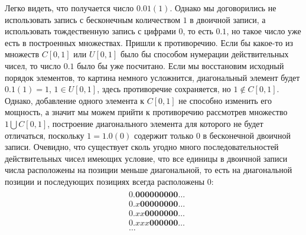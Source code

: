 \documentclass[12pt]{article}
\begin{document}
Легко видеть, что получается число $0.01(1)$. Однако мы договорились не использовать запись с бесконечным количеством $1$ в двоичной записи, а использовать тождественную запись с цифрами $0$, то есть $0.1$, но такое число уже есть в построенных множествах. Пришли к противоречию. Если бы какое-то из множеств $C[0, 1]$ или $U[0, 1]$ было бы способом нумерации действительных чисел, то число $0.1$ было бы уже посчитано. Если мы восстановим исходный порядок элементов, то картина немного усложнится, диагональный элемент будет $0.1(1) = 1$, $1 \in U[0, 1]$, здесь противоречие сохраняется, но $1 \notin C[0, 1]$. Однако, добавление одного элемента к $C[0, 1]$ не способно изменить его мощность, а значит мы можем прийти к противоречию рассмотрев множество $1 \bigcup  C[0, 1]$, построение диагонального элемента для которого не будет отличаться, поскольку $1 = 1.0(0)$ содержит только $0$ в бесконечной двоичной записи. Очевидно, что существует сколь угодно много последовательностей действительных чисел имеющих условие, что все единицы в двоичной записи числа расположены на позиции меньше диагональной, то есть на диагональной позиции и последующих позициях всегда расположены $0$:
\begin{align}
\begin{split}
&0.\textbf{000000000}\dots\\
&0.x\textbf{00000000}\dots\\
&0.xx\textbf{0000000}\dots\\
&0.xxx\textbf{000000}\dots\\
&\dots
\end{split}
\end{align}
\end{document}
